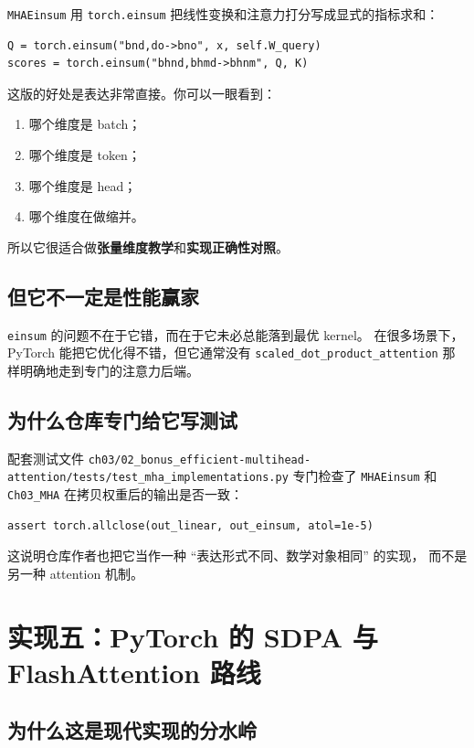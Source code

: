 \documentclass[12pt,a4paper]{ctexart}
\newcommand{\filepath}[1]{\texttt{#1}}
\newcommand{\code}[1]{\texttt{#1}}
\begin{document}
\code{MHAEinsum} 用 \code{torch.einsum} 把线性变换和注意力打分写成显式的指标求和：

\begin{lstlisting}[style=py]
Q = torch.einsum("bnd,do->bno", x, self.W_query)
scores = torch.einsum("bhnd,bhmd->bhnm", Q, K)
\end{lstlisting}

这版的好处是表达非常直接。你可以一眼看到：

\begin{enumerate}
  \item 哪个维度是 batch；
  \item 哪个维度是 token；
  \item 哪个维度是 head；
  \item 哪个维度在做缩并。
\end{enumerate}

所以它很适合做\textbf{张量维度教学}和\textbf{实现正确性对照}。

\subsection{但它不一定是性能赢家}

\code{einsum} 的问题不在于它错，而在于它未必总能落到最优 kernel。
在很多场景下，PyTorch 能把它优化得不错，但它通常没有
\code{scaled\_dot\_product\_attention} 那样明确地走到专门的注意力后端。

\subsection{为什么仓库专门给它写测试}

配套测试文件 \filepath{ch03/02\_bonus\_efficient-multihead-attention/tests/test\_mha\_implementations.py}
专门检查了 \code{MHAEinsum} 和 \code{Ch03\_MHA} 在拷贝权重后的输出是否一致：

\begin{lstlisting}[style=py]
assert torch.allclose(out_linear, out_einsum, atol=1e-5)
\end{lstlisting}

这说明仓库作者也把它当作一种 ``表达形式不同、数学对象相同'' 的实现，
而不是另一种 attention 机制。

\section{实现五：PyTorch 的 SDPA 与 FlashAttention 路线}

\subsection{为什么这是现代实现的分水岭}
\end{document}
